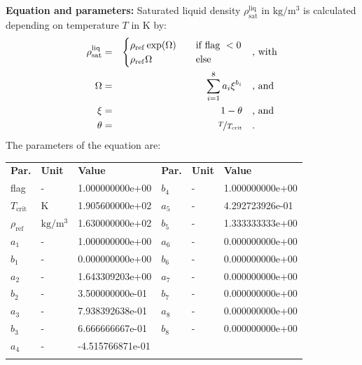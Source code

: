 \textbf{Equation and parameters:}
\newline
%
Saturated liquid density $\rho_\mathrm{sat}^\mathrm{liq}$ in $\si{\kilogram\per\cubic\meter}$ is calculated depending on temperature $T$ in $\si{\kelvin}$ by:
%
\begin{equation*}
\begin{split}
\rho_\mathrm{sat}^\mathrm{liq} &=& \begin{cases} \rho_\mathrm{ref} \exp(\Omega) & \quad \text{if flag } < 0 \\ \rho_\mathrm{ref} \Omega & \quad \text{else} \end{cases} & \quad\text{, with} \\
\Omega &=& \sum_{i=1}^{8} a_i \xi^{b_i} & \quad\text{, and} \\
\xi &=& 1 - \theta & \quad\text{, and} \\
\theta &=& \nicefrac{T}{T_\mathrm{crit}} & \quad\text{.}
\end{split}
\end{equation*}
%
The parameters of the equation are:
%
\begin{longtable}[l]{lll|lll}
\toprule
\addlinespace
\textbf{Par.} & \textbf{Unit} & \textbf{Value} &	\textbf{Par.} & \textbf{Unit} & \textbf{Value} \\
\addlinespace
\midrule
\endhead

\bottomrule
\endfoot
\bottomrule
\endlastfoot
\addlinespace

flag & - & 1.000000000e+00 & $b_4$ & - & 1.000000000e+00 \\
$T_\mathrm{crit}$ & $\si{\kelvin}$ & 1.905600000e+02 & $a_5$ & - & 4.292723926e-01 \\
$\rho_\mathrm{ref}$ & $\si{\kilogram\per\cubic\meter}$ & 1.630000000e+02 & $b_5$ & - & 1.333333333e+00 \\
$a_1$ & - & 1.000000000e+00 & $a_6$ & - & 0.000000000e+00 \\
$b_1$ & - & 0.000000000e+00 & $b_6$ & - & 0.000000000e+00 \\
$a_2$ & - & 1.643309203e+00 & $a_7$ & - & 0.000000000e+00 \\
$b_2$ & - & 3.500000000e-01 & $b_7$ & - & 0.000000000e+00 \\
$a_3$ & - & 7.938392638e-01 & $a_8$ & - & 0.000000000e+00 \\
$b_3$ & - & 6.666666667e-01 & $b_8$ & - & 0.000000000e+00 \\
$a_4$ & - & -4.515766871e-01 & & & \\

\addlinespace\end{longtable}

